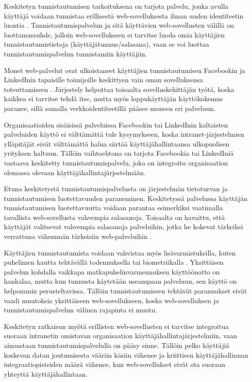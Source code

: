 Keskitetyn tunnistautumisen tarkoituksena on tarjota palvelu, jonka avulla käyttäjä voidaan tunnistaa erillisestä web-sovelluksesta ilman uuden identiteetin luontia \cite{facebook}. Tunnistautumispalvelun ja sitä käyttävien web-sovellusten välillä on luottamussuhde, jolloin web-sovellukseen ei tarvitse luoda omia käyttäjien tunnistautumistietoja (käyttäjätunnus/salasana), vaan se voi luottaa tunnistautumispalvelun tunnistamiin käyttäjiin.

Monet web-palvelut ovat ulkoistaneet käyttäjien tunnistautumisen Facebookin ja LinkedInin tapaisille toimijoille keskittyen vain oman sovelluksensa toteuttamiseen \cite{facebook}. Järjestely helpottaa toisaalta sovelluskehittäjän työtä, koska kaikkea ei tarvitse tehdä itse, mutta myös loppukäyttäjän käyttökokemus paranee, sillä samalla verkkoidentiteetillä pääsee moneen eri palveluun.

Organisaatioiden sisäisissä palveluissa Facebookin tai LinkedInin kaltaisten palveluiden käyttö ei välttämättä tule kysymykseen, koska intranet-järjestelmien ylläpitäjät eivät välttämättä halua siirtää käyttäjähallintaansa ulkopuolisen yrityksen haltuun. Tällöin vaihtoehtona on tarjota Facebookia tai LinkedIniä vastaava keskitetty tunnistautumispalvelu, joka on integroitu organisaation olemassa olevaan käyttäjähallintajärjestelmään.

Etuna keskitetystä tunnistautumispalvelusta on järjestelmän tietoturvan ja tunnistautumisen luotettavuuden paraneminen. Keskitetyssä palvelussa käyttäjän tunnistautumisen luotettavuutta voidaan parantaa esimerkiksi vaatimalla tavallista web-sovellusta vahvempia salasanoja. Toisaalta on havaittu, että käyttäjät valitsevat vahvempia salasanoja palveluihin, jotka he kokevat tärkeiksi verrattuna vähemmän tärkeisiin web-palveluihin \cite{password_habits}.

Käyttäjien tunnistautumista voidaan vahvistaa myös lisävarmistuksilla, kuten puhelimen kautta tehtävällä todennuksella tai biometriikalla \cite{nisti}. Yksittäisen palvelun kohdalla vaikkapa matkapuhelinvarmennuksen käyttöönotto on hankalaa, mutta kun tunnusta käytetään useampaan palveluun, sen käyttö on helpommin perusteltavissa. Tällöin tunnistautumiseen tehtävät parannukset eivät vaadi muutoksia yksittäiseen web-sovellukseen, koska web-sovelluksen ja tunnistautumispalvelun välinen rajapinta ei muutu.

Keskitetyn ratkaisun myötä erillisten web-sovellusten ei tarvitse integroitua suoraan intranetin omistavan organisaation käyttäjähallintajärjestelmiin, vaan ainoastaan tunnistautumispalvelulla on pääsy sinne. Tällöin pelko käyttäjiä koskevan datan joutumisesta vääriin käsiin vähenee ja kriittisen käyttäjähallinnan integraatiopisteiden määrä vähenee, kun web-sovellukset eivät ota suoraan yhteyttä käyttäjähallintaan.

